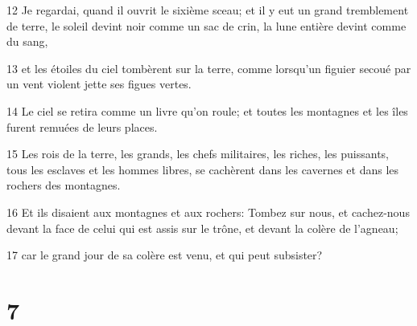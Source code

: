 \par 12 Je regardai, quand il ouvrit le sixième sceau; et il y eut un grand tremblement de terre, le soleil devint noir comme un sac de crin, la lune entière devint comme du sang,
\par 13 et les étoiles du ciel tombèrent sur la terre, comme lorsqu'un figuier secoué par un vent violent jette ses figues vertes.
\par 14 Le ciel se retira comme un livre qu'on roule; et toutes les montagnes et les îles furent remuées de leurs places.
\par 15 Les rois de la terre, les grands, les chefs militaires, les riches, les puissants, tous les esclaves et les hommes libres, se cachèrent dans les cavernes et dans les rochers des montagnes.
\par 16 Et ils disaient aux montagnes et aux rochers: Tombez sur nous, et cachez-nous devant la face de celui qui est assis sur le trône, et devant la colère de l'agneau;
\par 17 car le grand jour de sa colère est venu, et qui peut subsister?

\chapter{7}

